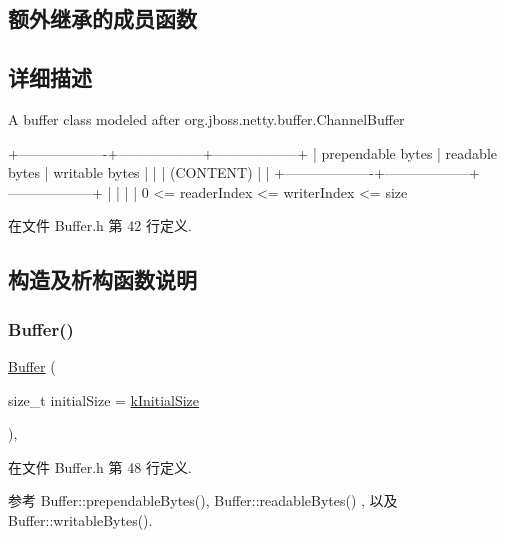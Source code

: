 \subsection*{额外继承的成员函数}


\subsection{详细描述}
A buffer class modeled after org.\+jboss.\+netty.\+buffer.\+Channel\+Buffer


\begin{DoxyCode}
+-------------------+------------------+------------------+
| prependable bytes |  readable bytes  |  writable bytes  |
|                   |     (CONTENT)    |                  |
+-------------------+------------------+------------------+
|                   |                  |                  |
0      <=      readerIndex   <=   writerIndex    <=     size
\end{DoxyCode}
 

在文件 Buffer.\+h 第 42 行定义.



\subsection{构造及析构函数说明}
\mbox{\label{classmuduo_1_1net_1_1Buffer_a3189a466a75c249c9371b74325e4fc53}} 
\subsubsection{\texorpdfstring{Buffer()}{Buffer()}}
{\footnotesize\ttfamily \hyperlink{classmuduo_1_1net_1_1Buffer}{Buffer} (\begin{DoxyParamCaption}\item[{size\+\_\+t}]{initial\+Size = {\ttfamily \hyperlink{classmuduo_1_1net_1_1Buffer_a50181a12c6e534352c6c3cf9e0d8b331}{k\+Initial\+Size}} }\end{DoxyParamCaption})\hspace{0.3cm}{\ttfamily [inline]}, {\ttfamily [explicit]}}



在文件 Buffer.\+h 第 48 行定义.



参考 Buffer\+::prependable\+Bytes(), Buffer\+::readable\+Bytes() , 以及 Buffer\+::writable\+Bytes().

